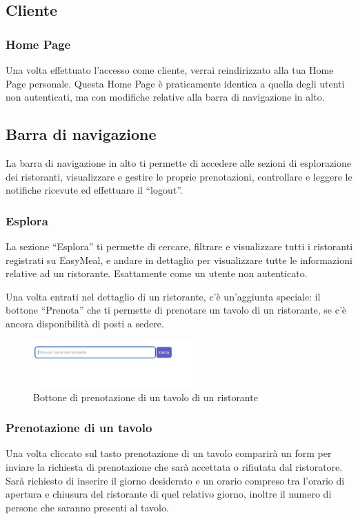 \subsection{Cliente} %

 
\subsubsection{Home Page}
Una volta effettuato l'accesso come cliente, verrai reindirizzato alla tua Home Page personale.
Questa Home Page è praticamente identica a quella degli utenti non autenticati, ma con modifiche 
relative alla barra di navigazione in alto. 


\subsection{Barra di navigazione}
La barra di navigazione in alto ti permette di accedere alle sezioni di esplorazione dei ristoranti, 
visualizzare e gestire le proprie prenotazioni, controllare e leggere le notifiche ricevute ed effettuare il ``logout''.

\subsubsection{Esplora}
La sezione ``Esplora'' ti permette di cercare, filtrare e visualizzare tutti i ristoranti registrati su EasyMeal, 
e andare in dettaglio per visualizzare tutte le informazioni relative ad un ristorante. Esattamente come un utente non autenticato.

Una volta entrati nel dettaglio di un ristorante, c'è un'aggiunta speciale: il bottone ``Prenota'' che ti permette di prenotare un tavolo di un ristorante, 
se c'è ancora disponibilità di posti a sedere.

\begin{figure}[htbp]
	\centering
	\includegraphics[width=0.5625\textwidth]{./img/Dettaglio.jpg}
	\caption{Bottone di prenotazione di un tavolo di un ristorante}
\end{figure}

\subsubsection{Prenotazione di un tavolo}
Una volta cliccato sul tasto prenotazione di un tavolo comparirà un form per inviare la richiesta di prenotazione che sarà accettata o rifiutata dal ristoratore.
Sarà richiesto di inserire il giorno desiderato e un orario compreso tra l'orario di apertura e chiusura del ristorante di quel relativo giorno, inoltre il numero 
di persone che saranno presenti al tavolo.

